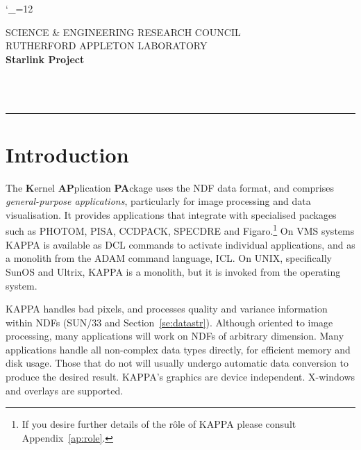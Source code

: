 \newcommand {\manheadstyle}{}

\catcode`\_=12



\thispagestyle{empty}
SCIENCE \& ENGINEERING RESEARCH COUNCIL \hfill \stardocname\\
RUTHERFORD APPLETON LABORATORY\\
{\large\bf Starlink Project\\}
{\large\bf \stardoccategory\ \stardocnumber}
\begin{flushright}
\stardocauthors\\
\stardocdate
\end{flushright}
\vspace{-4mm}
\rule{\textwidth}{0.5mm}
\vspace{5mm}
\begin{center}
{\Large\bf \stardoctitle}
\end{center}
\vspace{5mm}

\setlength{\parskip}{0mm} \tableofcontents
\setlength{\parskip}{\medskipamount} \markright{\stardocname} \newpage 

\section{Introduction}

The {\bf K}ernel {\bf AP}plication {\bf PA}ckage uses the NDF data
format, and comprises {\em general-purpose applications}, particularly
for image processing and data visualisation.  It provides applications
that integrate with specialised packages such as {\small PHOTOM},
{\small PISA}, {\small CCDPACK}, {\small SPECDRE} and
{\small Figaro}.\footnote{If you desire further details of the r\^{o}le
of KAPPA please consult Appendix~\ref{ap:role}.}
On {\small VMS} systems {\small KAPPA} is available as {\small DCL}
commands to activate individual applications, and as a monolith from the
{\small ADAM} command language, {\small ICL}. On {\small UNIX},
specifically {\small SunOS} and {\small Ultrix}, {\small KAPPA} is a
monolith, but it is invoked from the operating system. 

{\small KAPPA} handles bad pixels, and processes quality and variance
information within NDFs (SUN/33 and Section~\ref{se:datastr}).  Although
oriented to image processing, many applications will work on NDFs of
arbitrary dimension.  Many applications handle all non-complex data
types directly, for efficient memory and disk usage.  Those that do not
will usually undergo automatic data conversion to produce the desired
result.  {\small KAPPA}'s graphics are device independent.  X-windows
and overlays are supported.

